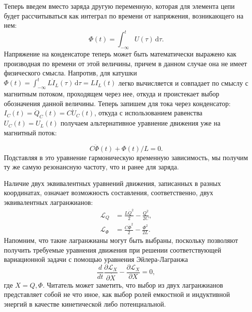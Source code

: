 \documentclass[14pt, a4paper]{extreport}
\newcommand{\diff}{\,\mathrm{d}}
\numberwithin{equation}{section}
\begin{document}
Теперь введем вместо заряда другую переменную, которая для элемента цепи будет рассчитываться как интеграл по времени от напряжения, возникающего на нем:
\begin{equation}
	\Phi(t) = \int_{-\infty}^{t} U(\tau) \diff \tau.\label{eq:phi_variable}
\end{equation}
Напряжение на конденсаторе теперь может быть математически выражено как производная по времени от этой величины, причем в данном случае она не имеет физического смысла. Напротив, для катушки $\Phi(t) = \int_{-\infty}^{t} L \dot I_L(\tau) \diff \tau = LI_L(t)	$  легко вычисляется и совпадает по смыслу с магнитным потоком, проходящем через нее, откуда и проистекает выбор обозначения данной величины. Теперь запишем для тока через конденсатор: $I_C(t) = \dot Q_C(t) = C \dot U_C(t)$, откуда с использованием равенства $U_C(t) = U_L(t)$ получаем альтернативное уравнение движения уже на магнитный поток:

\begin{equation}
	C \ddot \Phi(t) + \Phi(t)/L = 0.
\end{equation}
Подставляя в это уравнение гармоническую временную зависимость, мы получим ту же самую резонансную частоту, что и ранее для заряда.

Наличие двух эквивалентных уравнений движения, записанных в разных координатах, означает возможность составления, соответственно, двух эквивалентных лагранжианов:
\begin{align}
	\mathcal{L}_Q &= \frac{L \dot Q^2}{2} - \frac{Q^2}{2 C},\\
	\mathcal{L}_\Phi &= \frac{C\dot \Phi^2}{2} - \frac{\Phi^2}{2 L}.
\end{align}
Напомним, что такие лагранжианы могут быть выбраны, поскольку позволяют получить требуемые уравнения движения при решении соответствующей вариационной задачи с помощью уравнения Эйлера-Лагранжа
\begin{equation}
\frac{d}{d t}\frac{\partial \mathcal{L}_X}{\partial \dot X} - \frac{\partial \mathcal{L}_X}{\partial X} = 0,
\end{equation}
где $X = Q, \Phi$. Читатель может заметить, что выбор из двух лагранжианов представляет собой не что иное, как выбор ролей емкостной и индуктивной энергий в качестве кинетической либо потенциальной. 
\end{document}
